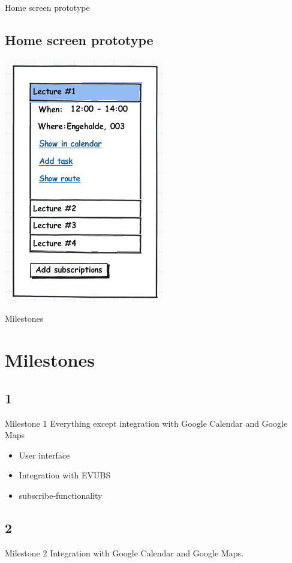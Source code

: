 \documentclass{beamer}
\begin{document}
\begin{frame}{Home screen prototype}
	\subsection{Home screen prototype}
	
	\begin{center}
		\includegraphics[scale=0.5]{home.png}
	\end{center}

\end{frame}

\begin{frame}{Milestones}
	\section{Milestones}
	\subsection{1}
		\begin{block}{Milestone 1}
		Everything except integration with Google Calendar and Google Maps
		\begin{itemize}
			\item User interface
			\item Integration with EVUBS
			\item subscribe-functionality
		\end{itemize}	
	\end{block}
\bigskip 
	\subsection{2}
	\begin{block}{Milestone 2}
	Integration with Google Calendar and Google Maps.
	\end{block}
\end{frame}
\end{document}
